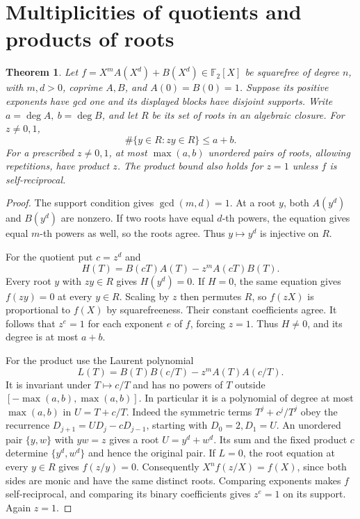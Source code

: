 \documentclass[11pt]{article}
\newtheorem{theorem}{Theorem}
\newcommand{\F}{\mathbb F_2}
\begin{document}
\section{Multiplicities of quotients and products of roots}
\begin{theorem}\label{thm:two-block}
Let \(f=X^mA(X^d)+B(X^d)\in\F[X]\) be squarefree of degree \(n\),
with \(m,d>0\), coprime \(A,B\), and \(A(0)=B(0)=1\).
Suppose its positive exponents have gcd one and its displayed blocks
have disjoint supports. Write \(a=\deg A,\ b=\deg B\), and let \(R\)
be its set of roots in an algebraic closure. For \(z\ne0,1\),
\[
 \#\{y\in R:zy\in R\}\le a+b.
\]
For a prescribed \(z\ne0,1\), at most \(\max(a,b)\) unordered pairs of
roots, allowing repetitions, have product \(z\). The product bound also
holds for \(z=1\) unless \(f\) is self-reciprocal.
\end{theorem}
\begin{proof}
The support condition gives \(\gcd(m,d)=1\). At a root \(y\), both
\(A(y^d)\) and \(B(y^d)\) are nonzero. If two roots have equal
\(d\)-th powers, the equation gives equal \(m\)-th powers as well,
so the roots agree. Thus \(y\mapsto y^d\) is injective on \(R\).

For the quotient put \(c=z^d\) and
\[
 H(T)= B(cT)A(T)-z^m A(cT)B(T).
\]
Every root \(y\) with \(zy\in R\) gives \(H(y^d)=0\).
If \(H=0\), the same equation gives \(f(zy)=0\) at every \(y\in R\).
Scaling by \(z\) then permutes \(R\), so \(f(zX)\) is proportional
to \(f(X)\) by squarefreeness. Their constant coefficients agree.
It follows that \(z^e=1\) for each exponent \(e\) of \(f\), forcing
\(z=1\). Thus \(H\ne0\), and its degree is at most \(a+b\).

For the product use the Laurent polynomial
\[
 L(T)=B(T)B(c/T)-z^m A(T)A(c/T).
\]
It is invariant under \(T\mapsto c/T\) and has no powers of \(T\)
outside \([-\max(a,b),\max(a,b)]\). In particular it is a polynomial
of degree at most \(\max(a,b)\) in \(U=T+c/T\). Indeed the symmetric
terms \(T^j+c^j/T^j\) obey the recurrence
\(D_{j+1}=U D_j-cD_{j-1}\), starting with \(D_0=2,D_1=U\).
An unordered pair \(\{y,w\}\) with \(yw=z\) gives a root
\(U=y^d+w^d\). Its sum and the fixed product \(c\) determine
\(\{y^d,w^d\}\) and hence the original pair.
If \(L=0\), the root equation at every \(y\in R\) gives \(f(z/y)=0\).
Consequently \(X^n f(z/X)=f(X)\), since both sides are monic and
have the same distinct roots. Comparing exponents makes \(f\)
self-reciprocal, and comparing its binary coefficients gives
\(z^e=1\) on its support. Again \(z=1\).
\end{proof}
\end{document}
